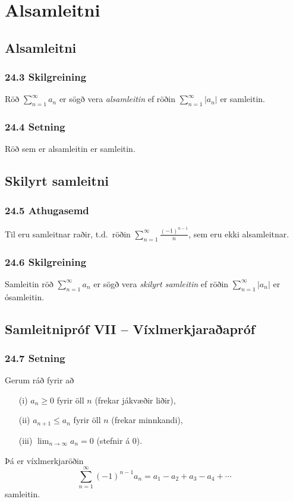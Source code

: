 \section*{Alsamleitni}

\subsection[t]{Alsamleitni}
 \subsubsection{24.3 Skilgreining}
Röð $\sum_{n=1}^\infty a_n$ er sögð vera {\em alsamleitin} ef röðin 
$\sum_{n=1}^\infty |a_n|$ er samleitin.
 

\pause

 \subsubsection{24.4 Setning}
Röð sem er alsamleitin er samleitin.  
 


\subsection[t]{Skilyrt samleitni}
 \subsubsection{24.5 Athugasemd}
Til eru samleitnar raðir, t.d.\
röðin  $\sum_{n=1}^\infty \frac{(-1)^{n-1}}{n}$, sem eru ekki
alsamleitnar. 
 

\pause

 \subsubsection{24.6 Skilgreining}
Samleitin röð $\sum_{n=1}^\infty a_n$ er sögð vera {\em skilyrt
  samleitin} 
ef röðin $\sum_{n=1}^\infty |a_n|$ er ósamleitin.
 


\subsection[t]{Samleitnipróf VII -- Víxlmerkjaraðapróf}
 \subsubsection{24.7 Setning}
Gerum ráð fyrir að 
\begin{itemize}
\item[(i)]  $a_n\geq 0$ fyrir öll $n$ (frekar jákvæðir liðir),\pause
\item[(ii)] $a_{n+1}\leq a_n$ fyrir öll $n$ (frekar minnkandi),\pause
\item[(iii)]  $\lim_{n\rightarrow\infty} a_n=0$ (stefnir á 0).\pause
\end{itemize}
Þá er víxlmerkjaröðin 
$$\sum_{n=1}^\infty (-1)^{n-1}a_n=a_1-a_2+a_3-a_4+\cdots$$
samleitin.
 

